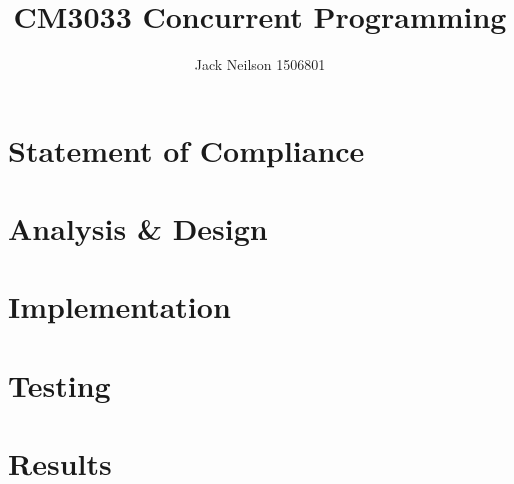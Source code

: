 \documentclass[12pt,a4paper,titlepage]{scrreprt}
\author{Jack Neilson 1506801}
\title{CM3033 Concurrent Programming}
\begin{document}
\maketitle

\tableofcontents

\chapter{Statement of Compliance}
\chapter{Analysis \textbf{\&} Design}
\chapter{Implementation}
\chapter{Testing}
\chapter{Results}
\end{document}
